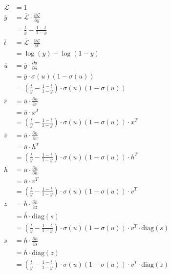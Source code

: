 \documentclass{article}
\begin{document}
\begin{enumerate}[(a)]
    \begin{align*}
        \overline{\mathcal{L}} &= 1\\[1em]
        \overline{y} &= \overline{\mathcal{L}} \cdot \frac{\partial \mathcal{L}}{\partial y}  \\
        &= \frac{t}{y} - \frac{1 - t}{1 - y}\\[1em]
        \overline{t} &= \overline{\mathcal{L}} \cdot \frac{\partial \mathcal{L}}{\partial t}  \\
        &= \log(y) - \log(1 - y)\\[1em]
        \overline{u} &= \overline{y} \cdot \frac{\partial y}{\partial u}  \\[1em]
        &= \overline{y} \cdot \sigma(u) (1 - \sigma(u))\\[1em]
        &= \left(\frac{t}{y} - \frac{1 - t}{1 - y}\right) \cdot \sigma(u) (1 - \sigma(u))\\[1em]
        \overline{r} &= \overline{u} \cdot \frac{\partial u}{\partial r}  \\
        &= \overline{u} \cdot x^T\\
        &= \left(\frac{t}{y} - \frac{1 - t}{1 - y}\right) \cdot \sigma(u) (1 - \sigma(u)) \cdot x^T\\[1em]
        \overline{v} &= \overline{u} \cdot \frac{\partial u}{\partial v}  \\
        &= \overline{u} \cdot h^T\\
        &= \left(\frac{t}{y} - \frac{1 - t}{1 - y}\right) \cdot \sigma(u) (1 - \sigma(u)) \cdot h^T\\[1em]
        \overline{h} &= \overline{u} \cdot \frac{\partial u}{\partial h}  \\[1em]
        &= \overline{u} \cdot v^T\\
        &= \left(\frac{t}{y} - \frac{1 - t}{1 - y}\right) \cdot \sigma(u) (1 - \sigma(u)) \cdot v^T\\[1em]
        \overline{z} &= \overline{h} \cdot \frac{\partial h}{\partial z}  \\
        &= \overline{h} \cdot \text{diag}(s)\\
        &= \left(\frac{t}{y} - \frac{1 - t}{1 - y}\right) \cdot \sigma(u) (1 - \sigma(u)) \cdot v^T \cdot \text{diag}(s)\\[1em]
        \overline{s} &= \overline{h} \cdot \frac{\partial h}{\partial s}  \\[1em]
        &= \overline{h} \cdot \text{diag}(z)\\
        &= \left(\frac{t}{y} - \frac{1 - t}{1 - y}\right) \cdot \sigma(u) (1 - \sigma(u)) \cdot v^T \cdot \text{diag}(z)\\[1em]
    \end{align*}


\end{enumerate}
\end{document}
